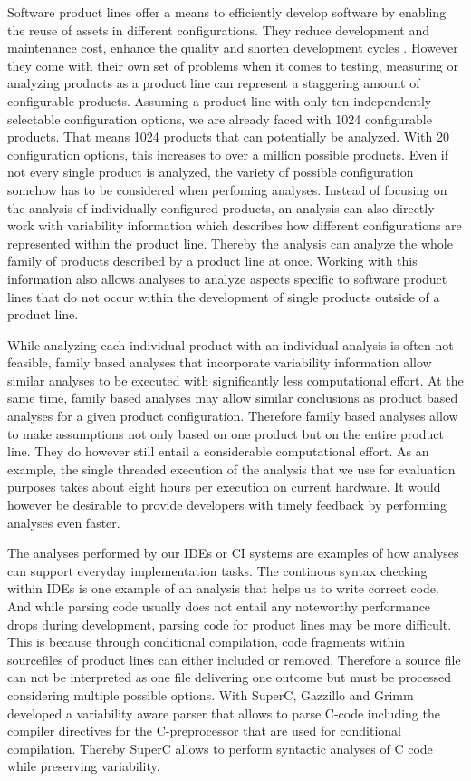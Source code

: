 \documentclass[a4paper]{article}
\begin{document}
Software product lines offer a means to efficiently develop software by enabling the reuse of assets in different configurations. They reduce development and maintenance cost, enhance the quality and shorten development cycles \cite{Pohl:2005:SPL:1095605} \cite{Apel:2013:FSP:2541773} \cite{spl-in-action}. However they come with their own set of problems when it comes to testing, measuring or analyzing products as a product line can represent a staggering amount of configurable products. Assuming a product line with only ten independently selectable configuration options, we are already faced with 1024 configurable products. That means 1024 products that can potentially be analyzed. With 20 configuration options, this increases to over a million possible products. Even if not every single product is analyzed, the variety of possible configuration somehow has to be considered when perfoming analyses. Instead of focusing on the analysis of individually configured products, an analysis can also directly work with variability information which describes how different configurations are represented within the product line. Thereby the analysis can analyze the whole family of products described by a product line at once. Working with this information also allows analyses to analyze aspects specific to software product lines that do not occur within the development of single products outside of a product line.

While analyzing each individual product with an individual analysis is often not feasible, family based analyses that incorporate variability information allow similar analyses to be executed with significantly less computational effort. At the same time, family based analyses may allow similar conclusions as product based analyses for a given product configuration. Therefore family based analyses allow to make assumptions not only based on one product but on the entire product line. They do however still entail a considerable computational effort. As an example, the single threaded execution of the analysis that we use for evaluation purposes takes about eight hours per execution on current hardware. It would however be desirable to provide developers with timely feedback by performing analyses even faster.

The analyses performed by our IDEs or CI systems are examples of how analyses can support everyday implementation tasks. 
The continous syntax checking within IDEs is one example of an analysis that helps us to write correct code. And while parsing code usually does not entail any noteworthy performance drops during development, parsing code for product lines may be more difficult. This is because through conditional compilation, code fragments within sourcefiles of product lines can either included or removed. Therefore a source file can not be interpreted as one file delivering one outcome but must be processed considering multiple possible options. With SuperC, Gazzillo and Grimm \cite{gazzillo-grimm} developed a variability aware parser that allows to parse C-code including the compiler directives for the C-preprocessor that are used for conditional compilation. Thereby SuperC allows to perform syntactic analyses of C code while preserving variability. 
\end{document}
